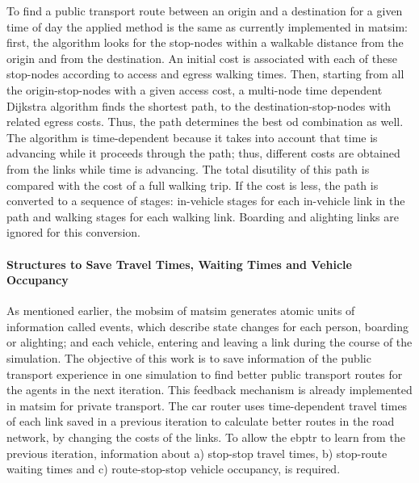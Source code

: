 To find a public transport route between an origin and a destination for a given time of day the applied method is the same as currently implemented in \gls{matsim}: first, the algorithm looks for the stop-nodes within a walkable distance from the origin and from the destination. An initial cost is associated with each of these stop-nodes according to access and egress walking times. Then, starting from all the origin-stop-nodes with a given access cost, a multi-node time dependent Dijkstra algorithm finds the shortest path, to the destination-stop-nodes with related egress costs. Thus, the path determines the best \gls{od} combination as well. The algorithm is time-dependent because it takes into account that time is advancing while it proceeds through the path; thus, different costs are obtained from the links while time is advancing. The total disutility of this path is compared with the cost of a full walking trip. If the cost is less, the path is converted to a sequence of stages: in-vehicle stages for each in-vehicle link in the path and walking stages for each walking link. Boarding and alighting links are ignored for this conversion.

\paragraph{Structures to Save Travel Times, Waiting Times and Vehicle Occupancy} 
\label{subsec:Structures}

As mentioned earlier, the \gls{mobsim} of \gls{matsim} generates atomic units of information called \glspl{event}, which describe state changes for each person, \eg boarding or alighting; and each vehicle, \eg entering and leaving a link during the course of the simulation. The objective of this work is to save information of the public transport experience in one simulation to find better public transport routes for the agents in the next iteration. This feedback mechanism is already implemented in \gls{matsim} for private transport. The car router uses time-dependent travel times of each link saved in a previous iteration to calculate better routes in the road network, by changing the costs of the links. To allow the \gls{ebptr} to learn from the previous iteration, information about a) stop-stop travel times, b) stop-route waiting times and c) route-stop-stop vehicle occupancy, is required.

